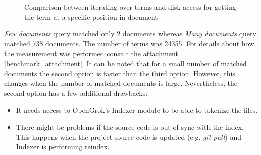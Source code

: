 \begin{figure}[htbp]
    \centering
    \caption{Comparison between iterating over terms and disk access for getting the term at a specific position in document}
    \label{comp_phrase}
\end{figure}

\textit{Few documents} query matched only 2 documents whereas \textit{Many documents} query matched 738 documents.
The number of terms was 24355. For details about how the measurement was performed consult the attachment
\ref{benchmark_attachment}.
It can be noted that for a small number of matched documents the second option is
faster than the third option. However, this changes when the number of matched documents is large. Nevertheless,
the second option has a few additional drawbacks:
\begin{itemize}
    \item It needs access to OpenGrok's Indexer module to be able to tokenize the files.
    \item There might be problems if the source code is out of sync with the index. This happens when the project source code
    is updated (e.g. \textit{git pull}) and Indexer is performing reindex.
\end{itemize}


